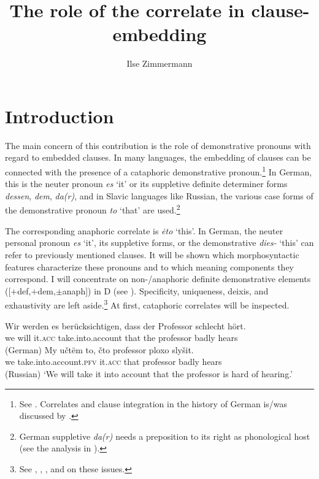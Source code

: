 \documentclass[output=paper,
colorlinks,
citecolor=brown,
newtxmath
]{langscibook}
\author{Ilse Zimmermann\affiliation{Leibniz-ZAS Berlin}}
\title{The role of the correlate in clause-embedding}
\begin{document}
\maketitle

\section{Introduction}\label{s:1}

The main concern of this contribution is the role of demonstrative pronouns with regard to embedded clauses. In many languages, the embedding of clauses can be connected with the presence of a cataphoric demonstrative pronoun.\footnote{See \citet{Pütz1986,Sudhoff2003,Sudhoff2016,Mollica2010,Willer-Gold2013,SchwabeFreyMeinunger2016,Bondaruk2015,Knjazev2016,Zimmermann1967,Zimmermann1983,Zimmermann1993,Zimmermann2016b,Zimmermann2016a,Zimmermann2018a,Zimmermann2019c}. Correlates and clause integration in the history of German is/was discussed by \citet{Axel2009,Axel-Tober2011}.}
In German, this is the neuter pronoun \textit{es} `it' or its suppletive definite determiner forms \textit{dessen}, \textit{dem}, \textit{da(r)}, and in Slavic languages like Russian, the various case forms of the demonstrative pronoun \textit{to} `that' are used.\footnote{German suppletive \textit{da(r)} needs a preposition to its right as phonological host (see the analysis in \citealt{Breindl1989}).}

The corresponding anaphoric correlate is \textit{ėto} `this'. In German, the neuter personal pronoun \textit{es} `it', its suppletive forms, or the demonstrative \textit{dies-} `this' can refer to previously mentioned clauses. It will be shown which morphosyntactic features characterize these pronouns and to which meaning components they correspond. I will concentrate on non-/anaphoric definite demonstrative elements ([$+$def,$+$dem,$\pm$anaph]) in D (see ). Specificity, uniqueness, deixis, and exhaustivity are left aside.\footnote{See  \citet{Schwarz2009}, \citet{Simik2016}, \citet{Bombi2018}, and \citet{Borik2019} on these issues.} At first, cataphoric correlates will be inspected.

\ea
    \ea\label{ex:1a}\gll Wir werden es berücksichtigen, dass der Professor schlecht hört.\\
    we will it.\textsc{acc} take.into.account that the professor badly hears\\ \hfill (German)
    \ex\label{ex:1b}\gll My učtëm to, čto professor ploxo slyšit. \\
    we take.into.account.\textsc{pfv} it.\textsc{acc} that professor badly hears\\ \hfill (Russian)
    \z
    \glt `We will take it into account that the professor is hard of hearing.'
\z
\end{document}
